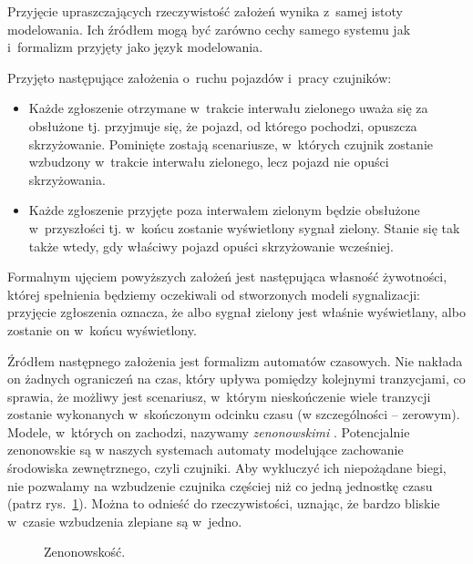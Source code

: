 \documentclass{pracamgr}
\newcommand{\imgr}[1]{rys.~\ref{#1}}
\theoremstyle{plain}
\begin{document}
Przyjęcie upraszczających rzeczywistość założeń wynika z~samej istoty
modelowania. Ich źródłem mogą być zarówno cechy samego systemu jak
i~formalizm przyjęty jako język modelowania.

Przyjęto następujące założenia o~ruchu pojazdów i~pracy czujników:
\begin{itemize}
  \item Każde zgłoszenie otrzymane w~trakcie interwału zielonego uważa
  się za obsłużone tj. przyjmuje się, że pojazd, od którego pochodzi,
  opuszcza skrzyżowanie. Pominięte zostają scenariusze, w~których
  czujnik zostanie wzbudzony w~trakcie interwału zielonego, lecz
  pojazd nie opuści skrzyżowania.
  \item Każde zgłoszenie przyjęte poza interwałem zielonym będzie
  obsłużone w~przyszłości tj. w~końcu zostanie wyświetlony sygnał
  zielony. Stanie się tak także wtedy, gdy właściwy pojazd opuści
  skrzyżowanie wcześniej. 
\end{itemize}
Formalnym ujęciem powyższych założeń jest następująca własność
żywotności, której spełnienia będziemy oczekiwali od stworzonych
modeli sygnalizacji: przyjęcie zgłoszenia oznacza, że albo sygnał
zielony jest właśnie wyświetlany, albo zostanie on w~końcu
wyświetlony.

Źródłem następnego założenia jest formalizm automatów czasowych. Nie
nakłada on żadnych ograniczeń na czas, który upływa pomiędzy kolejnymi
tranzycjami, co sprawia, że możliwy jest scenariusz, w~którym
nieskończenie wiele tranzycji zostanie wykonanych w~skończonym odcinku
czasu (w szczególności -- zerowym). Modele, w~których on zachodzi,
nazywamy \emph{zenonowskimi} \cite{henz-94}.  Potencjalnie zenonowskie
są w naszych systemach automaty modelujące zachowanie środowiska
zewnętrznego, czyli czujniki. Aby wykluczyć ich niepożądane biegi, nie
pozwalamy na wzbudzenie czujnika częściej niż co jedną jednostkę czasu
(patrz \imgr{img:models-zeno}). Można to odnieść do rzeczywistości,
uznając, że bardzo bliskie w~czasie wzbudzenia zlepiane są w~jedno.

\begin{figure}
  \centering
  \hspace{1in}
  \caption{Zenonowskość.}
  \label{img:models-zeno}
\end{figure}
\end{document}
